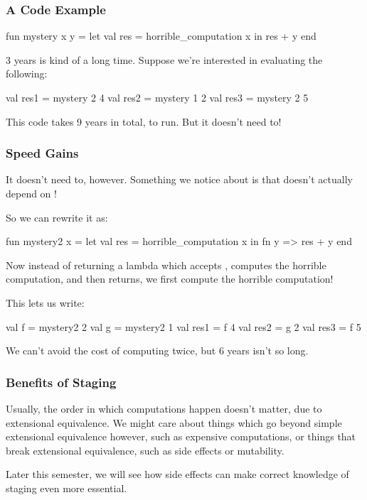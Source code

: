 \documentclass[aspectratio=169]{beamer}
\begin{document}
\begin{frame}[fragile]
  \frametitle{A Code Example}

  \begin{codeblock}
    fun mystery x y =
      let
        val res = horrible_computation x
      in
        res + y
      end 
  \end{codeblock}

  3 years is kind of a long time. Suppose we're interested in evaluating the following:

  \begin{codeblock}
    val res1 = mystery 2 4
    val res2 = mystery 1 2
    val res3 = mystery 2 5
  \end{codeblock}

  This code takes 9 years in total, to run. But it doesn't need to!
\end{frame}

\begin{frame}[fragile]
  \frametitle{Speed Gains}

  It doesn't need to, however. Something we notice about  is that
   doesn't actually depend on !

  So we can rewrite it as:
  \begin{codeblock}
    fun mystery2 x = 
      let
        val res = horrible_computation x
      in
        fn y => res + y
      end 
  \end{codeblock}

  Now instead of returning a lambda which accepts , computes the horrible 
  computation, and then returns, we first compute the horrible computation!

  This lets us write:

  \begin{codeblock}
    val f = mystery2 2
    val g = mystery2 1
    val res1 = f 4
    val res2 = g 2
    val res3 = f 5
  \end{codeblock}

  We can't avoid the cost of computing  twice, but 6 years isn't so long.
\end{frame}

\begin{frame}[fragile]
  \frametitle{Benefits of Staging}

  Usually, the order in which computations happen doesn't matter, due to extensional
  equivalence. We might care about things which go beyond simple extensional equivalence
  however, such as expensive computations, or things that break extensional equivalence,
  such as side effects or mutability.
  
  Later this semester, we will see how side effects can make correct knowledge of staging
  even more essential.
\end{frame}
\end{document}

